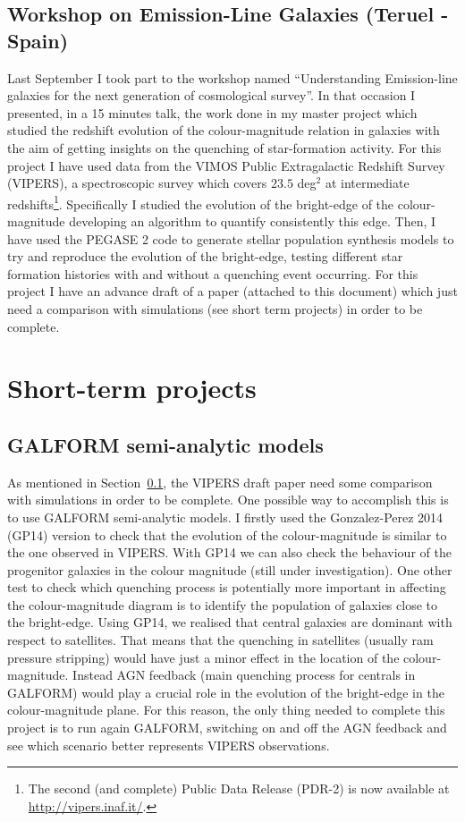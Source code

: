 \documentclass[letterpaper]{article}
\begin{document}
\subsection{Workshop on Emission-Line Galaxies (Teruel - Spain) }
\label{sub:teruel}

Last September I took part to the workshop named ``Understanding Emission-line galaxies for the next generation of cosmological survey''. In that occasion I presented, in a 15 minutes talk, the work done in my master project which studied the redshift evolution of the colour-magnitude relation in galaxies with the aim of getting insights on the quenching of star-formation activity. For this project I have used data from the VIMOS Public Extragalactic Redshift Survey (VIPERS), a spectroscopic survey which covers $23.5$ deg$^2$ at intermediate redshifts\footnote{The second (and complete) Public Data Release (PDR-2) is now available at \url{http://vipers.inaf.it/}. }. Specifically I studied the evolution of the bright-edge of the colour-magnitude developing an algorithm to quantify consistently this edge. Then, I have used the PEGASE 2 code to generate stellar population synthesis models to try and reproduce the evolution of the bright-edge, testing different star formation histories with and without a quenching event occurring. For this project I have an advance draft of a paper (attached to this document) which just need a comparison with simulations (see short term projects) in order to be complete.


\section{Short-term projects}
\label{sec:short}

\subsection{GALFORM semi-analytic models}
As mentioned in Section~\ref{sub:teruel}, the VIPERS draft paper need some comparison with simulations in order to be complete. One possible way to accomplish this is to use GALFORM semi-analytic models. I firstly used the Gonzalez-Perez 2014 (GP14) version to check that the evolution of the colour-magnitude is similar to the one observed in VIPERS. With GP14 we can also check the behaviour of the progenitor galaxies in the colour magnitude (still under investigation). One other test to check which quenching process is potentially more important in affecting the colour-magnitude diagram is to identify the population of galaxies close to the bright-edge. Using GP14, we realised that central galaxies are dominant with respect to satellites. That means that the quenching in satellites (usually ram pressure stripping) would have just a minor effect in the location of the colour-magnitude. Instead AGN feedback (main quenching process for centrals in GALFORM) would play a crucial role in the evolution of the bright-edge in the colour-magnitude plane. For this reason, the only thing needed to complete this project is to run again GALFORM, switching on and off the AGN feedback and see which scenario better represents VIPERS observations. 
\end{document}
